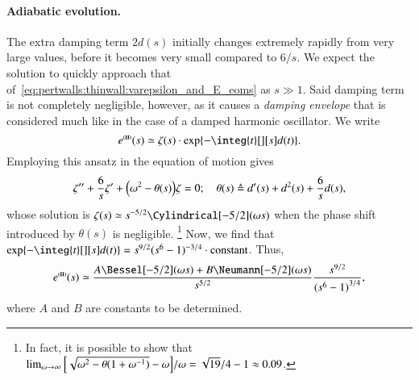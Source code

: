     \paragraph{Adiabatic evolution.} %
    The extra damping term $2d(s)$ initially changes extremely rapidly from very large values, before it becomes very small compared to $6/s$. We expect the solution to quickly approach that of~\cref{eq:pertwalls:thinwall:varepsilon_and_E_eoms} as $s\gg 1$. 
    Said damping term is not completely negligible, however, as it causes a \emph{damping envelope} that is considered much like in the case of a damped harmonic oscillator. We write
    \begin{equation}\label{eq:pertwalls:mywalls:eps_s_II_MD_w}
        e^{\text{\eqregimenum{II}}}(s) \simeq   \zeta(s) \cdot \exp{ - \integ{t}[][s] d(t) }.%
    \end{equation}
    Employing this ansatz in the equation of motion gives
    \begin{equation}
        \zeta'' + \frac{6}{s} \zeta' + {\left( \omega^2 - \theta(s)  \right)} \zeta= 0; \quad \theta(s) \triangleq d'(s) + d^2(s) + \frac{6}{s}d (s),
    \end{equation}
    whose solution is $\zeta(s) \simeq s^{-5/2}\Cylindrical[-5/2](\omega s)$ %
    when the phase shift introduced by $\theta(s)$ is negligible.%
    {\footnote{In fact, it is possible to show that $\lim_{\omega\to \infty}{{\left[ \sqrt{\omega^2-\theta(1+\omega^{-1})}-\omega \right]} /\omega }= \sqrt{19}/4 -1 \approx 0.09$.}} %
    Now, we find that $\exp{-\integ{t}[][s] d(t)} =s^{9/2} (s^6-1)^{-3/4}  \cdot \text{constant}$. Thus,
    \begin{equation}\label{eq:pertwalls:mywalls:eps_s_II_MD}
        e^{\text{\eqregimenum{II}}}(s) \simeq \frac{ A \Bessel[-5/2](\omega s) + B \Neumann[-5/2](\omega s) }{s^{5/2}} \frac{s^{9/2}}{{(s^6-1)}^{3/4}},
    \end{equation}
    where $A$ and $B$ are constants to be determined.

